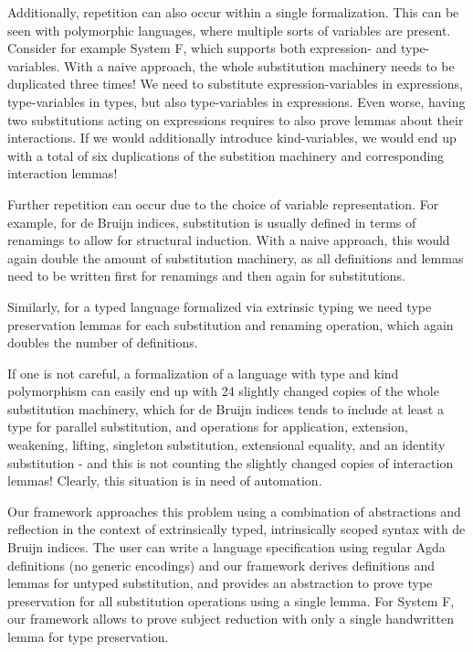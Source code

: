 \documentclass[a4paper, UKenglish, cleveref, autoref, thm-restate]{lipics-v2021}
\begin{document}
  Additionally, repetition can also occur within a single formalization.
  This can be seen with polymorphic languages, where multiple sorts
  of variables are present.
  Consider for example System F, which supports both expression- and
  type-variables.
  With a naive approach, the whole substitution machinery needs to be
  duplicated three times! We need to substitute expression-variables in
  expressions, type-variables in types, but also type-variables in
  expressions.
  Even worse, having two substitutions acting on expressions requires
  to also prove lemmas about their interactions.
  If we would additionally introduce kind-variables, we would end up
  with a total of six duplications of the substition machinery and
  corresponding interaction lemmas!
  
  Further repetition can occur due to the choice of variable
  representation. For example, for de Bruijn indices, substitution is
  usually defined in terms of renamings to allow for structural
  induction.
  With a naive approach, this would again double the amount of
  substitution machinery, as all definitions and lemmas need to be
  written first for renamings and then again for substitutions.

  Similarly, for a typed language formalized via extrinsic typing we
  need type preservation lemmas for each substitution and renaming
  operation, which again doubles the number of definitions.

  If one is not careful, a formalization of a language with type and
  kind polymorphism can easily end up with 24 slightly changed copies of
  the whole substitution machinery, which for de Bruijn indices tends to
  include at least a type for parallel substitution, and operations for
  application, extension, weakening, lifting, singleton substitution,
  extensional equality, and an identity substitution - and this is not
  counting the slightly changed copies of interaction lemmas!
  Clearly, this situation is in need of automation.

  Our framework approaches this problem using a combination of
  abstractions and reflection in the context of extrinsically typed,
  intrinsically scoped syntax with de Bruijn indices.
  The user can write a language specification using regular Agda
  definitions (no generic encodings) and our framework derives
  definitions and lemmas for untyped substitution, and provides an
  abstraction to prove type preservation for all substitution operations
  using a single lemma. For System F, our framework allows to prove
  subject reduction with only a single handwritten lemma for type
  preservation.
\end{document}
